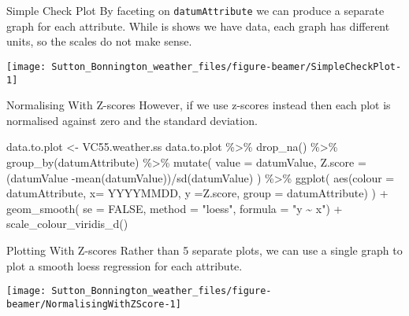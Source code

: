 \documentclass[
  ignorenonframetext,
]{beamer}
\newenvironment{Shaded}{\begin{snugshade}}{\end{snugshade}}
\newcommand{\AttributeTok}[1]{\textcolor[rgb]{0.77,0.63,0.00}{#1}}
\newcommand{\ConstantTok}[1]{\textcolor[rgb]{0.00,0.00,0.00}{#1}}
\newcommand{\FunctionTok}[1]{\textcolor[rgb]{0.00,0.00,0.00}{#1}}
\newcommand{\NormalTok}[1]{#1}
\newcommand{\OtherTok}[1]{\textcolor[rgb]{0.56,0.35,0.01}{#1}}
\newcommand{\SpecialCharTok}[1]{\textcolor[rgb]{0.00,0.00,0.00}{#1}}
\newcommand{\StringTok}[1]{\textcolor[rgb]{0.31,0.60,0.02}{#1}}
\begin{document}
\begin{frame}[fragile]{Simple Check Plot}
\protect\hypertarget{simple-check-plot}{}
By faceting on \texttt{datumAttribute} we can produce a separate graph
for each attribute. While is shows we have data, each graph has
different units, so the scales do not make sense.

\begin{center}\texttt{[image: Sutton\_Bonnington\_weather\_files/figure-beamer/SimpleCheckPlot-1]} \end{center}
\end{frame}

\begin{frame}[fragile]{Normalising With Z-scores}
\protect\hypertarget{normalising-with-z-scores}{}
However, if we use z-scores instead then each plot is normalised against
zero and the standard deviation.

\begin{Shaded}
\begin{Highlighting}[]
\NormalTok{data.to.plot }\OtherTok{\textless{}{-}}\NormalTok{ VC55.weather.ss}
\NormalTok{ data.to.plot }\SpecialCharTok{\%\textgreater{}\%} \FunctionTok{drop\_na}\NormalTok{() }\SpecialCharTok{\%\textgreater{}\%}
  \FunctionTok{group\_by}\NormalTok{(datumAttribute) }\SpecialCharTok{\%\textgreater{}\%} 
  \FunctionTok{mutate}\NormalTok{( }\AttributeTok{value =}\NormalTok{ datumValue,}
  \AttributeTok{Z.score =} 
\NormalTok{    (datumValue }\SpecialCharTok{{-}}\FunctionTok{mean}\NormalTok{(datumValue))}\SpecialCharTok{/}\FunctionTok{sd}\NormalTok{(datumValue)}
\NormalTok{        ) }\SpecialCharTok{\%\textgreater{}\%}
  \FunctionTok{ggplot}\NormalTok{( }\FunctionTok{aes}\NormalTok{(}\AttributeTok{colour =}\NormalTok{ datumAttribute, }
              \AttributeTok{x=}\NormalTok{ YYYYMMDD, }\AttributeTok{y =}\NormalTok{Z.score, }
              \AttributeTok{group =}\NormalTok{ datumAttribute) ) }\SpecialCharTok{+} 
              \FunctionTok{geom\_smooth}\NormalTok{( }\AttributeTok{se =} \ConstantTok{FALSE}\NormalTok{, }
                           \AttributeTok{method =} \StringTok{"loess"}\NormalTok{, }
                           \AttributeTok{formula =} \StringTok{"y \textasciitilde{} x"}\NormalTok{) }\SpecialCharTok{+} 
              \FunctionTok{scale\_colour\_viridis\_d}\NormalTok{()}
\end{Highlighting}
\end{Shaded}
\end{frame}

\begin{frame}{Plotting With Z-scores}
\protect\hypertarget{plotting-with-z-scores}{}
Rather than 5 separate plots, we can use a single graph to plot a smooth
loess regression for each attribute.

\begin{center}\texttt{[image: Sutton\_Bonnington\_weather\_files/figure-beamer/NormalisingWithZScore-1]} \end{center}
\end{frame}
\end{document}
